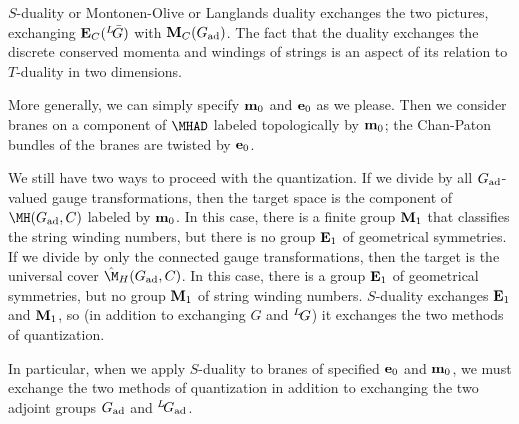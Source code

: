 $S$-duality or Montonen-Olive or Langlands duality exchanges the
two pictures, exchanging ${\bf E}_C({}^L\negthinspace\bar G)$ with
${\bf M}_C(G_{\rm{ad}})$. The fact that the duality exchanges the
discrete conserved momenta and windings of strings is an aspect of
its relation to $T$-duality in two dimensions.

\par{}

More generally, we can  simply specify ${\bf m}_0$ and ${\bf e}_0$
as we please. Then we consider branes on a component of $\MHAD$
labeled topologically by ${\bf m}_0$; the Chan-Paton bundles of
the branes are twisted by ${\bf e}_0$.

We still have two ways to proceed with the quantization.  If we
divide by all $G_{\rm {ad}}$-valued gauge transformations, then
the target space is the component of $\MH(G_{\rm ad},C)$ labeled
by ${\bf m}_0$.  In this case, there is a finite group ${\bf M}_1$
that classifies the string winding numbers, but there is no group
${\bf E}_1$ of geometrical symmetries.  If we divide by only the
connected gauge transformations, then the target is the universal
cover $\hat\M_H(G_{\rm ad},C)$.  In this case, there is a group
${\bf E}_1$ of geometrical symmetries, but no group ${\bf M}_1$ of
string winding numbers.  $S$-duality exchanges ${\bf E}_1$ and
${\bf M}_1$, so (in addition to exchanging $G$ and
$^L\negthinspace G$) it exchanges the two methods of quantization.

In particular, when we apply $S$-duality to branes of specified
${\bf e}_0$ and ${\bf m}_0$, we must exchange the two methods of
quantization in addition to exchanging the two adjoint groups
$G_{\rm ad}$ and $^L\negthinspace G_{\rm ad}$.
